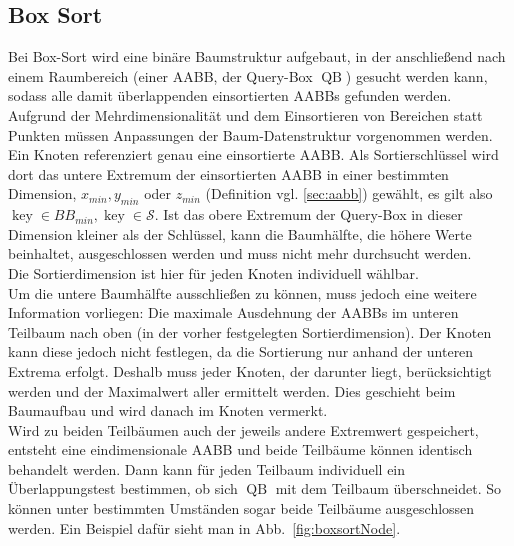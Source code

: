 \subsection{Box Sort}
\label{sec:boxsort}
Bei Box-Sort \cite{houthuys1987box}
 wird eine binäre Baumstruktur aufgebaut, in der anschließend nach einem Raumbereich (einer AABB, der Query-Box
\newcommand{\qb}{\operatorname{QB}}
 $\qb$) gesucht werden kann, sodass alle damit überlappenden einsortierten AABBs gefunden werden. Aufgrund der Mehrdimensionalität und dem Einsortieren von Bereichen statt Punkten müssen Anpassungen der Baum-Datenstruktur vorgenommen werden.\\
Ein Knoten referenziert genau eine einsortierte AABB. Als Sortierschlüssel wird dort das untere Extremum der einsortierten AABB in einer bestimmten Dimension, $x_{min},y_{min}$ oder $z_{min}$  (Definition vgl. \ref{sec:aabb}) gewählt, es gilt also $\operatorname{key} \in BB_{min}, \operatorname{key} \in \mathcal{S} $. 
Ist das obere Extremum der Query-Box in dieser Dimension kleiner als der Schlüssel, kann die Baumhälfte, die höhere Werte beinhaltet, ausgeschlossen werden und muss nicht mehr durchsucht werden. \\
Die Sortierdimension ist hier für jeden Knoten individuell wählbar.\\
Um die untere Baumhälfte ausschließen zu können, muss jedoch eine weitere Information vorliegen: Die maximale Ausdehnung der AABBs im unteren Teilbaum nach oben (in der vorher festgelegten Sortierdimension). Der Knoten kann diese jedoch nicht festlegen, da die Sortierung nur anhand der unteren Extrema erfolgt. Deshalb muss jeder Knoten, der darunter liegt, berücksichtigt werden und der Maximalwert aller ermittelt werden. Dies geschieht beim Baumaufbau und wird danach im Knoten vermerkt.\\
Wird zu beiden Teilbäumen auch der jeweils andere Extremwert gespeichert, entsteht eine eindimensionale AABB und beide Teilbäume können identisch behandelt werden. Dann kann für jeden Teilbaum individuell ein Überlappungstest bestimmen, ob sich $\qb$ mit dem Teilbaum überschneidet. So können unter bestimmten Umständen sogar beide Teilbäume ausgeschlossen werden. Ein Beispiel dafür sieht man in Abb.~\ref{fig:boxsortNode}.\\


